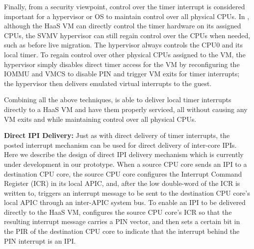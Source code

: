 Finally, from a security viewpoint, control over the timer interrupt is considered important for a hypervisor or OS to maintain control over all physical CPUs.
In \na, although the HaaS VM can directly control the timer hardware on its assigned CPUs, the SVMV hypervisor can still regain 
control over the CPUs when needed, such as before live migration. 
The hypervisor always controls the CPU0 and its local timer. 
To regain control over other physical CPUs assigned to the VM, the hypervisor 
simply disables direct timer access for the VM by reconfiguring the IOMMU and VMCS to 
disable PIN and trigger VM exits for timer interrupts; the hypervisor then delivers
emulated virtual interrupts to the guest.

Combining all the above techniques, \na is able to deliver local timer interrupts 
directly to a HaaS VM and have them properly serviced, 
all without causing any VM exits and while maintaining control over all physical CPUs.


{\bf Direct IPI Delivery:} 
Just as with direct delivery of timer interrupts, the posted interrupt mechanism can be used for direct delivery of inter-core IPIs.
Here we describe the design of direct IPI delivery mechanism which is currently under development in our prototype.
When a source CPU core sends an IPI to a destination CPU core, the source CPU core configures the Interrupt Command Register (ICR) in its local APIC, 
and, after the low double-word of the ICR is written to, triggers an interrupt message to be sent to the destination CPU core's local APIC through an inter-APIC system bus.
To enable an IPI to be delivered directly to the HaaS VM, \na configures the source CPU core's ICR so that the resulting interrupt message carries a PIN vector,
and then sets a certain bit in the PIR of the destination CPU core to indicate that the interrupt behind the PIN interrupt is an IPI.

 



